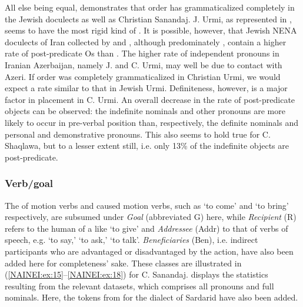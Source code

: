 \documentclass[output=paper,colorlinks,citecolor=brown,draftmode]{langscibook}
\begin{document}
All else being equal,  demonstrates that  order has grammaticalized completely in the Jewish doculects as well as Christian Sanandaj. J. Urmi, as represented in \citet{Khan2008Barwar}, seems to have the most rigid kind of . It is possible, however, that Jewish NENA doculects of Iran collected by \citet{Garbell1065a} and \citet{Hopkins1989Naghada}, although predominately , contain a  higher rate of post-predicate Os than \citet{Khan2008Barwar}. The higher rate of independent pronouns in Iranian Azerbaijan, namely J. and C. Urmi, may well be due to contact with Azeri. If  order was completely grammaticalized in Christian Urmi, we would expect a rate similar to that in Jewish Urmi. Definiteness, however, is a major factor in  placement in C. Urmi. An overall decrease in the rate of post-predicate objects can be observed: the indefinite nominals and other pronouns are more likely to occur in pre-verbal position than, respectively, the definite nominals and personal and demonstrative pronouns.  This also seems to hold true for C. Shaqlawa, but to a lesser extent still, i.e. only 13\% of the indefinite objects are post-predicate.

\subsubsection{Verb/goal}\label{NAINEI:sec:2.2.2}

The  of motion verbs and caused motion verbs, such as `to come' and `to bring' respectively, are subsumed under \textit{Goal} (abbreviated G) here, while  \textit{Recipient} (R) refers to the human  of a  like `to give' and \textit{Addressee} (Addr) to that of verbs of speech, e.g. `to say,' `to ask,' `to talk'. \textit{Beneficiaries} (Ben), i.e. indirect participants who are advantaged or disadvantaged by the action, have also been added here for completeness' sake. These  classes are illustrated in (\ref{NAINEI:ex:15}--\ref{NAINEI:ex:18}) for C. Sanandaj.  displays the statistics resulting from the relevant datasets, which comprises all pronouns and full nominals. Here, the tokens from \citet{Younansardaroud2001Sardarid} for the dialect of Sardarid have also been added.
\end{document}
